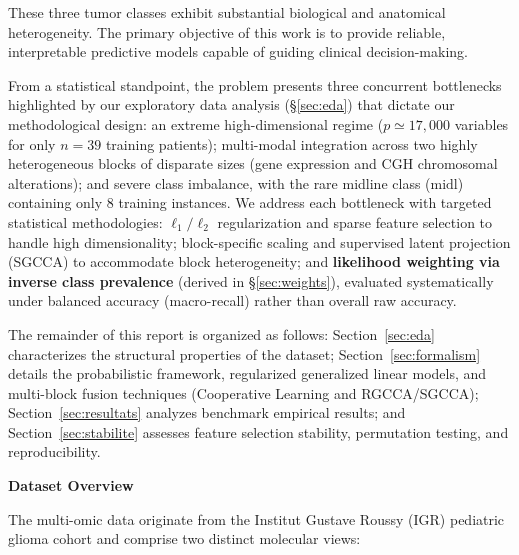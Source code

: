 \documentclass[a4paper,11pt]{paper}
\theoremstyle{plain}
\theoremstyle{definition}
\theoremstyle{remark}
\begin{document}
These three tumor classes exhibit substantial biological and anatomical heterogeneity. The primary objective of this work is to provide reliable, interpretable predictive models capable of guiding clinical decision-making.

From a statistical standpoint, the problem presents three concurrent bottlenecks highlighted by our exploratory data analysis (§\ref{sec:eda}) that dictate our methodological design: an extreme high-dimensional regime ($p \simeq 17{,}000$ variables for only $n = 39$ training patients); multi-modal integration across two highly heterogeneous blocks of disparate sizes (gene expression and CGH chromosomal alterations); and severe class imbalance, with the rare midline class ($\text{midl}$) containing only $8$ training instances. We address each bottleneck with targeted statistical methodologies: $\ell_1/\ell_2$ regularization and sparse feature selection to handle high dimensionality; block-specific scaling and supervised latent projection (SGCCA) to accommodate block heterogeneity; and \textbf{likelihood weighting via inverse class prevalence} (derived in §\ref{sec:weights}), evaluated systematically under balanced accuracy (macro-recall) rather than overall raw accuracy.

The remainder of this report is organized as follows: Section~\ref{sec:eda} characterizes the structural properties of the dataset; Section~\ref{sec:formalism} details the probabilistic framework, regularized generalized linear models, and multi-block fusion techniques (Cooperative Learning and RGCCA/SGCCA); Section~\ref{sec:resultats} analyzes benchmark empirical results; and Section~\ref{sec:stabilite} assesses feature selection stability, permutation testing, and reproducibility.


\begin{center}
    \Large \textbf{Dataset Overview}
\end{center}

The multi-omic data originate from the Institut Gustave Roussy (IGR) pediatric glioma cohort and comprise two distinct molecular views:

\bigskip
\end{document}
